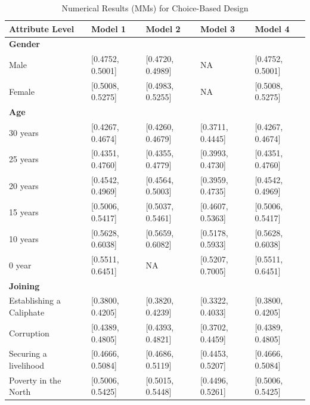 \begin{table}[H]
\footnotesize
\setlength{\tabcolsep}{5pt}
\begin{threeparttable}
\caption{Numerical Results (MMs) for Choice-Based Design}
\label{tab:art2-app-tab5}
\begin{tabular}{lllll}
\toprule
\midrule
Attribute Level & Model 1                       & Model 2               & Model 3               & Model 4 \\ [0.9ex]
\midrule
\textbf{Gender} \\  
Male    & [0.4752, 0.5001]                      & [0.4720, 0.4989]      & NA                    & [0.4752, 0.5001]  \\ 
Female  & [0.5008, 0.5275]                      & [0.4983, 0.5255]      & NA                    & [0.5008, 0.5275] \\ [0.9ex]
\textbf{Age} \\  
30 years & [0.4267, 0.4674]                     & [0.4260, 0.4679]      & [0.3711, 0.4445]      & [0.4267, 0.4674]  \\ 
25 years & [0.4351, 0.4760]                     & [0.4355, 0.4779]      & [0.3993, 0.4730]      & [0.4351, 0.4760] \\ 
20 years & [0.4542, 0.4969]                     & [0.4564, 0.5003]      & [0.3959, 0.4735]      & [0.4542, 0.4969] \\ 
15 years & [0.5006, 0.5417]                     & [0.5037, 0.5461]      & [0.4607, 0.5363]      & [0.5006, 0.5417] \\ 
10 years & [0.5628, 0.6038]                     & [0.5659, 0.6082]      & [0.5178, 0.5933]      & [0.5628, 0.6038] \\ 
0 year   & [0.5511, 0.6451]                     & NA                    & [0.5207, 0.7005]      & [0.5511, 0.6451]\\ [0.9ex]
\textbf{Joining} \\  
Establishing a Caliphate & [0.3800, 0.4205]     & [0.3820, 0.4239]      & [0.3322, 0.4033]      & [0.3800, 0.4205]  \\ 
Corruption              & [0.4389, 0.4805]      & [0.4393, 0.4821]      & [0.3702, 0.4459]      & [0.4389, 0.4805]\\ 
Securing a livelihood   & [0.4666, 0.5084]      & [0.4686, 0.5119]      & [0.4453, 0.5207]      & [0.4666, 0.5084]\\
Poverty in the North    & [0.5006, 0.5425]      & [0.5015, 0.5448]      & [0.4496, 0.5261]      & [0.5006, 0.5425] \\ 

\end{tabular}
\end{threeparttable}
\end{table}
